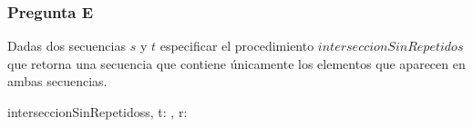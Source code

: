 \subsubsection{Pregunta E}

Dadas dos secuencias $s$ y $t$ especificar el procedimiento $interseccionSinRepetidos$ que retorna una secuencia que contiene únicamente los elementos que aparecen en ambas secuencias.

\begin{proc}{interseccionSinRepetidos}{\In s, t: , \Out r: }{}
\end{proc}




